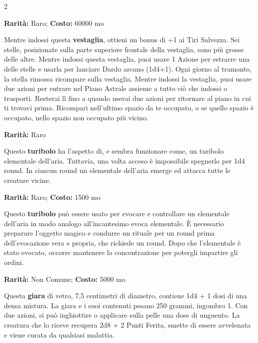 \begin{multicols}{2}

\textbf{Rarità:} Raro; \textbf{Costo:} 60000 mo

Mentre indossi questa \textbf{vestaglia}, ottieni un bonus di +1 ai Tiri Salvezza. Sei stelle, posizionate sulla parte superiore frontale della vestaglia, sono più grosse delle altre. Mentre indossi questa vestaglia, puoi usare 1 Azione per estrarre una delle stelle e usarla per lanciare Dardo arcano (1d4+1). Ogni giorno al tramonto, la stella rimossa ricompare sulla vestaglia. Mentre indossi la vestaglia, puoi usare due azioni per entrare nel Piano Astrale assieme a tutto ciò che indossi o trasporti. Resterai lì fino a quando userai due azioni per ritornare al piano in cui ti trovavi prima. Ricompari nell'ultimo spazio da te occupato, o se quello spazio è occupato, nello spazio non occupato più vicino.


\textbf{Rarità:} Raro

Questo \textbf{turibolo} ha l'aspetto di, e sembra funzionare come, un turibolo elementale dell'aria. Tuttavia, una volta acceso è impossibile spegnerlo per 1d4 round. In ciascun round un elementale dell'aria emerge ed attacca tutte le creature vicine.


\textbf{Rarità:} Raro; \textbf{Costo:} 1500 mo

Questo \textbf{turibolo} può essere usato per evocare e controllare un elementale dell'aria in modo analogo all'incantesimo evoca elementale. È necessario preparare l'oggetto magico e condurre un rituale per un round prima dell'evocazione vera e propria, che richiede un round. Dopo che l'elementale è stato evocato, occorre mantenere la concentrazione per potergli impartire gli ordini.


\textbf{Rarità:} Non Comune; \textbf{Costo:} 5000 mo

Questa \textbf{giara} di vetro, 7,5 centimetri di diametro, contiene 1d4 + 1 dosi di una densa mistura. La giara e i suoi contenuti pesano 250 grammi, ingombro 1. Con due azioni, si può inghiottire o applicare sulla pelle una dose di unguento. La creatura che lo riceve recupera 2d8 + 2 Punti Ferita, smette di essere avvelenata e viene curata da qualsiasi malattia.



\end{multicols}
